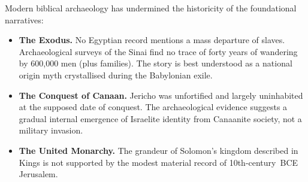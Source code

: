 \documentclass[11pt,twoside]{article}
\begin{document}
\begin{scheda}

Modern biblical archaeology has
undermined the historicity of the foundational narratives:

\begin{itemize}
  \item \textbf{The Exodus.}
    No Egyptian record mentions a mass departure of slaves.
    Archaeological surveys of the Sinai find no trace of forty years of
    wandering by 600,000 men (plus families).  The story is best understood
    as a national origin myth crystallised during the Babylonian
    exile.
  \item \textbf{The Conquest of Canaan.}
    Jericho was unfortified and largely uninhabited at the
    supposed date of conquest.  The archaeological evidence suggests a gradual
    internal emergence of Israelite identity from Canaanite
    society, not a military invasion.
  \item \textbf{The United Monarchy.}
    The grandeur of Solomon's kingdom described in Kings is
    not supported by the modest material record of 10th-century~BCE
    Jerusalem.
\end{itemize}
\end{scheda}
\end{document}
